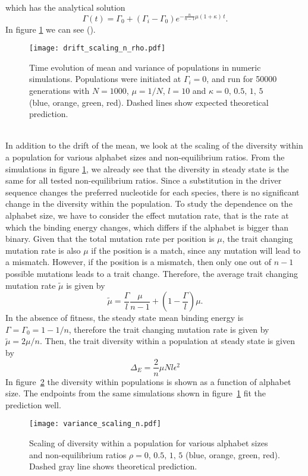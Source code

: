 which has the analytical solution
\begin{equation}
    \Gamma(t) = \Gamma_0 + (\Gamma_i - \Gamma_0)e^{-\frac{n}{n-1}\mu\left(1+\kappa\right)\, t}. 
\end{equation}
In figure \ref{fig:drift_scaling_n_rho} we can see ().
\begin{figure}
    \centering
    \texttt{[image: drift\_scaling\_n\_rho.pdf]}
    \caption{Time evolution of mean and variance of populations in numeric simulations. Populations were initiated at $\Gamma_i=0$, and run for 50000 generations with $N=1000$, $\mu = 1/N$, $l=10$ and $\kappa= 0,\,0.5,\,1,\,5$ (blue, orange, green, red). Dashed lines show expected theoretical prediction.}
    \label{fig:drift_scaling_n_rho}
\end{figure}\\

\noindent In addition to the drift of the mean, we look at the scaling of the diversity within a population for various alphabet sizes and non-equilibrium ratios. From the simulations in figure \ref{fig:drift_scaling_n_rho}, we already see that the diversity in steady state is the same for all tested non-equilibrium ratios. Since a substitution in the driver sequence changes the preferred nucleotide for each species, there is no significant change in the diversity within the population. To study the dependence on the alphabet size, we have to consider the effect mutation rate, that is the rate at which the binding energy changes, which differs if the alphabet is bigger than binary. Given that the total mutation rate per position is $\mu$, the trait changing mutation rate is also $\mu$ if the position is a match, since any mutation will lead to a mismatch. However, if the position is a mismatch, then only one out of $n-1$ possible mutations leads to a trait change. Therefore, the average trait changing mutation rate $\tilde \mu$ is given by
\begin{equation}
    \tilde \mu = \frac{\Gamma}{l} \frac{\mu}{n-1} + \left(1 - \frac{\Gamma}{l} \right) \mu.
\end{equation}
In the absence of fitness, the steady state mean binding energy is $\Gamma=\Gamma_0=1-1/n$, therefore the trait changing mutation rate is given by $\tilde \mu = 2\mu/n$. Then, the trait diversity within a population at steady state is given by 
\begin{equation}
    \Delta_E = \frac{2}{n}\mu Nl\epsilon^2
\end{equation}
In figure~\ref{fig:variance_scaling_n} the diversity within populations is shown as a function of alphabet size. The endpoints from the same simulations shown in figure~\ref{fig:drift_scaling_n_rho} fit the prediction well.

\begin{figure}
    \centering
    \texttt{[image: variance\_scaling\_n.pdf]}
    \caption{Scaling of diversity within a population for various alphabet sizes and non-equilibrium ratios $\rho= 0,\,0.5,\,1,\,5$ (blue, orange, green, red). Dashed gray line shows theoretical prediction.}
    \label{fig:variance_scaling_n}
\end{figure}


